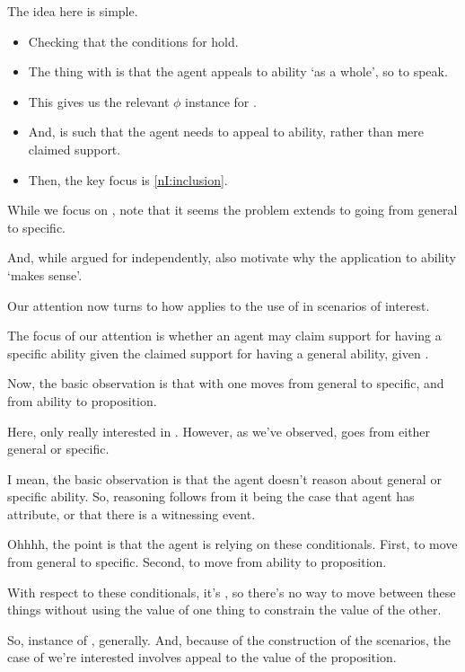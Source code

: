 \begin{note}
  The idea here is simple.
  \begin{itemize}
  \item Checking that the conditions for \nI{} hold.
  \item The thing with \adA{} is that the agent appeals to ability `as a whole', so to speak.
  \item This gives us the relevant \(\phi\) instance for \nI{}.
  \item And,  is such that the agent needs to appeal to ability, rather than mere claimed support.
  \item Then, the key focus is \ref{nI:inclusion}.
  \end{itemize}

  While we focus on , note that it seems the problem extends to going from general to specific.

  And, while argued for \nI{} independently, also motivate why the application to ability `makes sense'.
\end{note}

\begin{note}
  Our attention now turns to how \nI{} applies to the use of  in scenarios of interest.

  The focus of our attention is whether an agent may claim support for having a specific ability given the claimed support for having a general ability, given \gsi{}.
\end{note}

\begin{note}
  Now, the basic observation is that with \adA{} one moves from general to specific, and from ability to proposition.

  Here, only really interested in .
  However, as we've observed, goes from either general or specific.

  I mean, the basic observation is that the agent doesn't reason about general or specific ability.
  So, reasoning follows from it being the case that agent has attribute, or that there is a witnessing event.

  Ohhhh, the point is that the agent is relying on these conditionals.
  First, to move from general to specific.
  Second, to move from ability to proposition.

  With respect to these conditionals, it's \adA{}, so there's no way to move between these things without using the value of one thing to constrain the value of the other.

  So, instance of \adA{}, generally.
  And, because of the construction of the scenarios, the case of \adA{} we're interested involves appeal to the value of the proposition.
\end{note}

